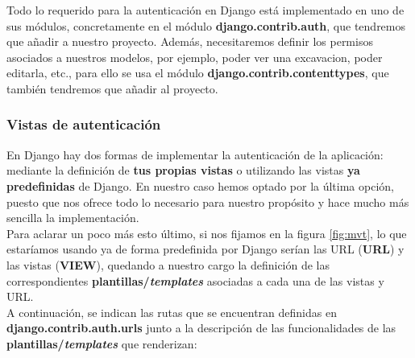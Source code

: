 Todo lo requerido para la autenticación en Django está implementado en uno de sus módulos,
concretamente en el módulo \textbf{django.contrib.auth}, que tendremos que añadir a
nuestro proyecto. Además, necesitaremos definir los permisos asociados a nuestros modelos,
por ejemplo, poder ver una excavacion, poder editarla, etc., para ello se usa el módulo
\textbf{django.contrib.contenttypes}, que también tendremos que añadir al proyecto.

\subsubsection{Vistas de autenticación}
En Django hay dos formas de implementar la autenticación de la aplicación: mediante la
definición de \textbf{tus propias vistas} o utilizando las vistas \textbf{ya predefinidas}
de Django. En nuestro caso hemos optado por la última opción, puesto que nos ofrece todo lo
necesario para nuestro propósito y hace mucho más sencilla la implementación.\\

Para aclarar un poco más esto último, si nos fijamos en la figura \ref{fig:mvt}, lo que
estaríamos usando ya de forma predefinida por Django serían las URL (\textbf{URL}) y las
vistas (\textbf{VIEW}), quedando a nuestro cargo la definición de las correspondientes
\textbf{plantillas/\textit{templates}} asociadas a cada una de las vistas y URL.\\

A continuación, se indican las rutas que se encuentran definidas en
\textbf{django.contrib.auth.urls} junto a la descripción de las funcionalidades de las
\textbf{plantillas/\textit{templates}} que renderizan:

